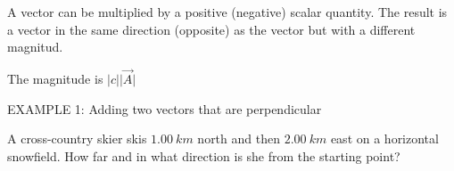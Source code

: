 \documentclass[]{beamer}
\begin{document}


\begin{frame}

  A vector can be multiplied by a positive (negative) scalar quantity. The result is a vector 
  in the same direction (opposite) as the vector but with a different magnitud.
  
  The magnitude is $\lvert c \rvert \lvert \vec{A} \rvert$
  \end{frame}
  
  
  \begin{frame}
  
  EXAMPLE 1: Adding two vectors that are perpendicular
  \vspace{3 mm}
  
  A cross-country skier skis $1.00~km$ north and then $2.00~km$ east on
  a horizontal snowfield. How far and in what direction is she from
  the starting point?
  
  
  
  
  
  \end{frame}





\end{document}
